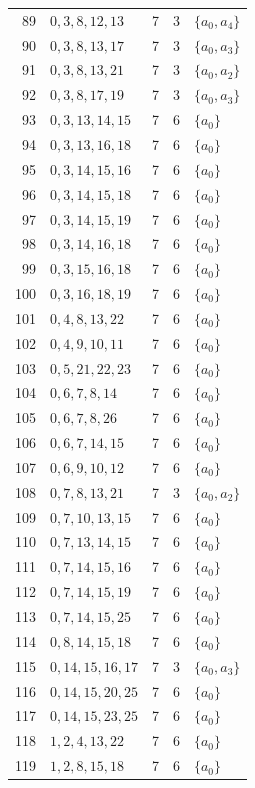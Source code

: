 \begin{longtable}{@{}r l c c l@{}}
89 & $0,3,8,12,13$ & 7 & 3 & $\{a_{0},a_{4}\}$\\
90 & $0,3,8,13,17$ & 7 & 3 & $\{a_{0},a_{3}\}$\\
91 & $0,3,8,13,21$ & 7 & 3 & $\{a_{0},a_{2}\}$\\
92 & $0,3,8,17,19$ & 7 & 3 & $\{a_{0},a_{3}\}$\\
93 & $0,3,13,14,15$ & 7 & 6 & $\{a_{0}\}$\\
94 & $0,3,13,16,18$ & 7 & 6 & $\{a_{0}\}$\\
95 & $0,3,14,15,16$ & 7 & 6 & $\{a_{0}\}$\\
96 & $0,3,14,15,18$ & 7 & 6 & $\{a_{0}\}$\\
97 & $0,3,14,15,19$ & 7 & 6 & $\{a_{0}\}$\\
98 & $0,3,14,16,18$ & 7 & 6 & $\{a_{0}\}$\\
99 & $0,3,15,16,18$ & 7 & 6 & $\{a_{0}\}$\\
100 & $0,3,16,18,19$ & 7 & 6 & $\{a_{0}\}$\\
101 & $0,4,8,13,22$ & 7 & 6 & $\{a_{0}\}$\\
102 & $0,4,9,10,11$ & 7 & 6 & $\{a_{0}\}$\\
103 & $0,5,21,22,23$ & 7 & 6 & $\{a_{0}\}$\\
104 & $0,6,7,8,14$ & 7 & 6 & $\{a_{0}\}$\\
105 & $0,6,7,8,26$ & 7 & 6 & $\{a_{0}\}$\\
106 & $0,6,7,14,15$ & 7 & 6 & $\{a_{0}\}$\\
107 & $0,6,9,10,12$ & 7 & 6 & $\{a_{0}\}$\\
108 & $0,7,8,13,21$ & 7 & 3 & $\{a_{0},a_{2}\}$\\
109 & $0,7,10,13,15$ & 7 & 6 & $\{a_{0}\}$\\
110 & $0,7,13,14,15$ & 7 & 6 & $\{a_{0}\}$\\
111 & $0,7,14,15,16$ & 7 & 6 & $\{a_{0}\}$\\
112 & $0,7,14,15,19$ & 7 & 6 & $\{a_{0}\}$\\
113 & $0,7,14,15,25$ & 7 & 6 & $\{a_{0}\}$\\
114 & $0,8,14,15,18$ & 7 & 6 & $\{a_{0}\}$\\
115 & $0,14,15,16,17$ & 7 & 3 & $\{a_{0},a_{3}\}$\\
116 & $0,14,15,20,25$ & 7 & 6 & $\{a_{0}\}$\\
117 & $0,14,15,23,25$ & 7 & 6 & $\{a_{0}\}$\\
118 & $1,2,4,13,22$ & 7 & 6 & $\{a_{0}\}$\\
119 & $1,2,8,15,18$ & 7 & 6 & $\{a_{0}\}$\\

\end{longtable}
